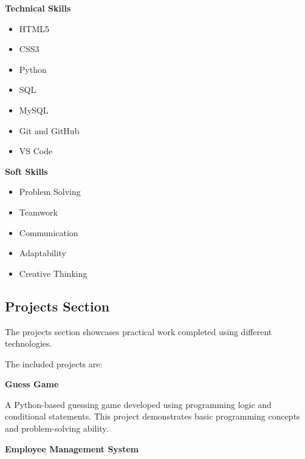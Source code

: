 \documentclass[12pt,a4paper]{article}
\begin{document}
\textbf{Technical Skills}

\begin{itemize}

\item HTML5

\item CSS3

\item Python

\item SQL

\item MySQL

\item Git and GitHub

\item VS Code

\end{itemize}



\textbf{Soft Skills}

\begin{itemize}

\item Problem Solving

\item Teamwork

\item Communication

\item Adaptability

\item Creative Thinking

\end{itemize}





\subsection{Projects Section}


The projects section showcases practical work completed using different technologies.

The included projects are:



\textbf{Guess Game}

A Python-based guessing game developed using programming logic and conditional statements. This project demonstrates basic programming concepts and problem-solving ability.



\textbf{Employee Management System}
\end{document}
